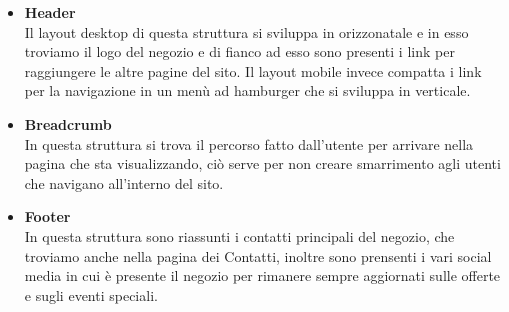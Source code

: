	\begin{itemize}
		\item \textbf{Header}\\Il layout desktop di questa struttura si sviluppa in orizzonatale e in esso troviamo il logo del negozio e di fianco ad esso sono presenti i link per raggiungere le altre pagine del sito. Il layout mobile invece compatta i link per la navigazione in un menù ad hamburger che si sviluppa in verticale.
		\item \textbf{Breadcrumb}\\In questa struttura si trova il percorso fatto dall'utente per arrivare nella pagina che sta visualizzando, ciò serve per non creare smarrimento agli utenti che navigano all'interno del sito.
		\item \textbf{Footer}\\In questa struttura sono riassunti i contatti principali del negozio, che troviamo anche nella pagina dei Contatti, inoltre sono prensenti i vari social media in cui è presente il negozio per rimanere sempre aggiornati sulle offerte e sugli eventi speciali.
 	\end{itemize}
 		
